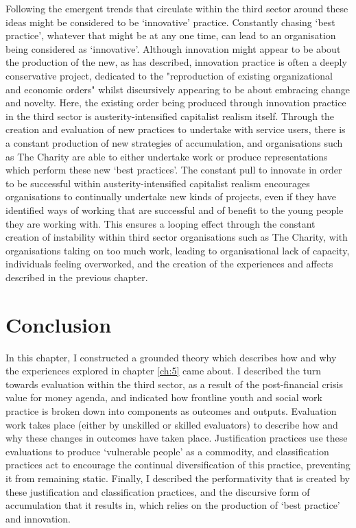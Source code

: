 Following the emergent trends that circulate within the third sector around these ideas might be considered to be `innovative' practice. Constantly chasing `best practice', whatever that might be at any one time, can lead to an organisation being considered as `innovative'. Although innovation might appear to be about the production of the new, as \citet[p. 331]{suchman_problematizing_2000} has described, innovation practice is often a deeply conservative project, dedicated to the "reproduction of existing organizational and economic orders" whilst discursively appearing to be about embracing change and novelty. Here, the existing order being produced through innovation practice in the third sector is austerity-intensified capitalist realism itself. Through the creation and evaluation of new practices to undertake with service users, there is a constant production of new strategies of accumulation, and organisations such as The Charity are able to either undertake work or produce representations which perform these new `best practices'. The constant pull to innovate in order to be successful within austerity-intensified capitalist realism encourages organisations to continually undertake new kinds of projects, even if they have identified ways of working that are successful and of benefit to the young people they are working with. This ensures a looping effect through the constant creation of instability within third sector organisations such as The Charity, with organisations taking on too much work, leading to organisational lack of capacity, individuals feeling overworked, and the creation of the experiences and affects described in the previous chapter. 

\section{Conclusion}
\label{sec:6-8-conclusion}
In this chapter, I constructed a grounded theory which describes how and why the experiences explored in chapter \ref{ch:5} came about. I described the turn towards evaluation within the third sector, as a result of the post-financial crisis value for money agenda, and indicated how frontline youth and social work practice is broken down into components as outcomes and outputs. Evaluation work takes place (either by unskilled or skilled evaluators) to describe how and why these changes in outcomes have taken place. Justification practices use these evaluations to produce `vulnerable people' as a commodity, and classification practices act to encourage the continual diversification of this practice, preventing it from remaining static. Finally, I described the performativity that is created by these justification and classification practices, and the discursive form of accumulation that it results in, which relies on the production of `best practice' and innovation.


